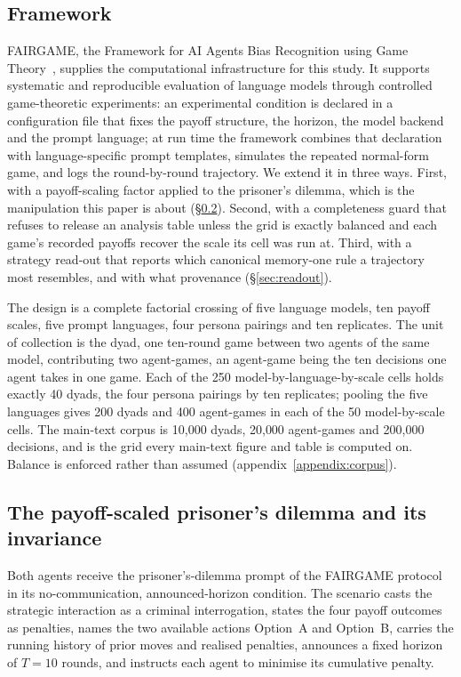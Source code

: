 \documentclass[11pt,a4paper]{article}
\begin{document}
\subsection{Framework}\label{sec:background}

FAIRGAME, the Framework for AI Agents Bias Recognition using Game
Theory~\cite{buscemi2025fairgame}, supplies the computational infrastructure
for this study. It supports systematic and reproducible evaluation of language
models through controlled game-theoretic experiments: an experimental condition
is declared in a configuration file that fixes the payoff structure, the
horizon, the model backend and the prompt language; at run time the framework
combines that declaration with language-specific prompt templates, simulates
the repeated normal-form game, and logs the round-by-round trajectory. We
extend it in three ways. First, with a payoff-scaling factor applied to the
prisoner's dilemma, which is the manipulation this paper is about
(\S\ref{sec:gameImportance}). Second, with a completeness guard that refuses to
release an analysis table unless the grid is exactly balanced and each game's
recorded payoffs recover the scale its cell was run at. Third, with a strategy
read-out that reports which canonical memory-one rule a trajectory most
resembles, and with what provenance (\S\ref{sec:readout}).

The design is a complete factorial crossing of five language models, ten payoff
scales, five prompt languages, four persona pairings and ten replicates. The
unit of collection is the dyad, one ten-round game between two agents of the
same model, contributing two agent-games, an agent-game being the ten decisions
one agent takes in one game. Each of the 250 model-by-language-by-scale cells
holds exactly 40 dyads, the four persona pairings by ten replicates; pooling
the five languages gives 200 dyads and 400 agent-games in each of the 50
model-by-scale cells. The main-text corpus is 10{,}000 dyads, 20{,}000
agent-games and 200{,}000 decisions, and is the grid every main-text figure and
table is computed on. Balance is enforced rather than assumed
(appendix~\ref{appendix:corpus}).

\subsection{The payoff-scaled prisoner's dilemma and its invariance}\label{sec:gameImportance}

Both agents receive the prisoner's-dilemma prompt of the FAIRGAME
protocol~\cite{buscemi2025fairgame} in its no-communication, announced-horizon
condition. The scenario casts the strategic interaction as a criminal
interrogation, states the four payoff outcomes as penalties, names the two
available actions Option~A and Option~B, carries the running history of prior
moves and realised penalties, announces a fixed horizon of $T = 10$ rounds, and
instructs each agent to minimise its cumulative penalty.
\end{document}
